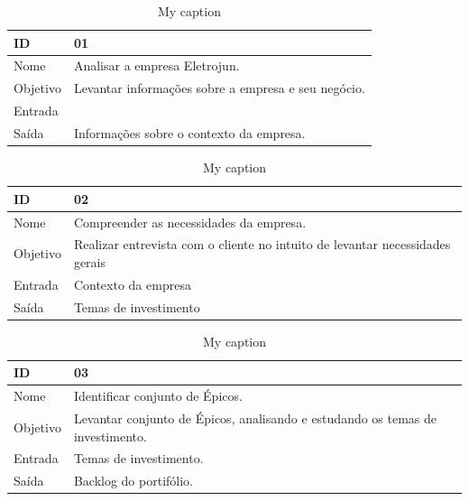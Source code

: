 \begin{table}[\htp]
\centering
\caption{My caption}
\label{my-label}
\begin{tabular}{|l|l|}
\hline
ID       & 01                                                  \\ \hline
Nome     & Analisar a empresa Eletrojun.                       \\ \hline
Objetivo & Levantar informações sobre a empresa e seu negócio. \\ \hline
Entrada  &                                                     \\ \hline
Saída    & Informações sobre o contexto da empresa.            \\ \hline
\end{tabular}
\end{table}

\begin{table}[\htp]
\centering
\caption{My caption}
\label{my-label}
\begin{tabular}{|l|l|}
\hline
ID       & 02                                                  \\ \hline
Nome     & Compreender as necessidades da empresa. \\ \hline
Objetivo & Realizar entrevista com o cliente no intuito de levantar necessidades gerais \\ \hline
Entrada  &  Contexto da empresa \\ \hline
Saída    & Temas de investimento \\ \hline
\end{tabular}
\end{table}

\begin{table}[\htp]
\centering
\caption{My caption}
\label{my-label}
\begin{tabular}{|l|l|}
\hline
ID       & 03                                                 \\ \hline
Nome     & Identificar conjunto de Épicos. \\ \hline
Objetivo & Levantar conjunto de Épicos, analisando e estudando os temas de investimento.
 \\ \hline
Entrada  &  Temas de investimento. \\ \hline
Saída    & Backlog do portifólio.  \\ \hline
\end{tabular}
\end{table}

